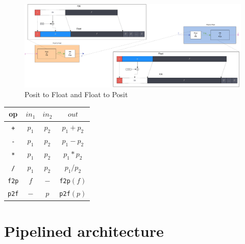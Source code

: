 \begin{figure}[H]
    \centering
    \includegraphics[width=\textwidth]{figures/posit_to_float_and_float_to_posit.pdf}
    \caption{Posit to Float and Float to Posit}
    \label{fig:posittofloatandfloattoposit}
\end{figure}

\begin{table}
\begin{center}
\begin{tabular}{||c c c | c||}
    \hline
    op & $in_1$ & $in_2$ & $out$ \\ [0.5ex]
    \hline\hline
    \texttt{+} & $p_1$ & $p_2$ & $p_1 + p_2$ \\
    \hline
    \texttt{-} & $p_1$ & $p_2$ & $p_1 - p_2$ \\
    \hline
    \texttt{*} & $p_1$ & $p_2$ & $p_1 * p_2$ \\
    \hline
    \texttt{/} & $p_1$ & $p_2$ & $p_1 / p_2$ \\
    \hline
    \texttt{f2p} & $f$ & $-$ & \texttt{f2p}$(f)$ \\
    \hline
    \texttt{p2f} & $-$ & $p$ & \texttt{p2f}$(p)$ \\
    \hline
\end{tabular}
\label{Tab:table_ops_ppu}
\end{center}
\end{table}




\section{Pipelined architecture}\label{pipelined_ppu_section}




